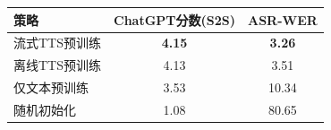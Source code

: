 \begin{table}[!htbp]
    \label{tab:llamaomni2_pretrain}
    \centering
    \small
    \begin{tabular}{lcc}
        \toprule
        \textbf{策略} & \textbf{ChatGPT分数(S2S)} & \textbf{ASR-WER} \\
        \midrule
        流式TTS预训练 & \textbf{4.15} & \textbf{3.26} \\
        离线TTS预训练 & 4.13 & 3.51 \\
        仅文本预训练 & 3.53 & 10.34 \\
        随机初始化 & 1.08 & 80.65 \\
        \bottomrule
    \end{tabular}
\end{table}
